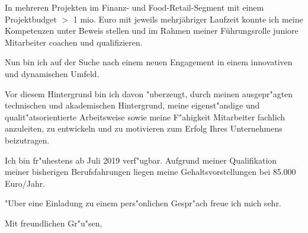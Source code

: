 \documentclass[10pt,a4paper]{dinbrief}
\begin{document}
\begin{letter}
In mehreren Projekten im Finanz- und Food-Retail-Segment mit einem Projektbudget $>$ 1 mio. Euro mit jeweils mehrjähriger Laufzeit konnte ich meine Kompetenzen unter Beweis stellen und im Rahmen meiner Führungsrolle juniore Mitarbeiter coachen und qualifizieren. 

Nun bin ich auf der Suche nach einem neuen Engagement in einem innovativen und dynamischen Umfeld.

Vor diesem Hintergrund bin ich davon "uberzeugt, durch meinen ausgepr"agten technischen und akademischen Hintergrund, meine eigenst"andige und qualit"atsorientierte Arbeitsweise sowie meine F"ahigkeit Mitarbeiter fachlich anzuleiten, zu entwickeln und zu motivieren zum Erfolg Ihres Unternehmens beizutragen.

Ich bin fr"uhestens ab Juli 2019 verf"ugbar. Aufgrund meiner Qualifikation meiner bisherigen Berufsfahrungen liegen meine Gehaltsvorstellungen bei 85.000 Euro/Jahr. 

"Uber eine Einladung zu einem pers"onlichen Gespr"ach freue ich mich sehr.

\closing{Mit freundlichen Gr"u"sen,}
\end{letter}
\end{document}
